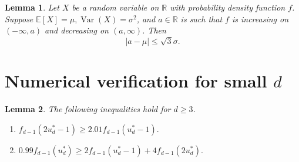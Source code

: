 \documentclass[10pt,a4paper]{amsart}
\newtheorem{lem}{Lemma}
\newcommand{\EE}{\mathbb{E}}
\newcommand{\RR}{\mathbb{R}}
\DeclareMathOperator{\Var}{Var}
\begin{document}
\begin{lem} \label{lem:unimodal}
    Let $X$ be a random variable on $\RR$ with probability density function $f$. Suppose $\EE[X]=\mu, \Var(X)=\sigma^2$, and $a\in \RR$ is such that $f$ is increasing on $(-\infty,a)$ and decreasing on $(a,\infty)$. Then 
    \[|a-\mu|\leq \sqrt{3}\sigma.\]
\end{lem}

\section{Numerical verification for small \texorpdfstring{$d$}{d}} \label{sec:numerical}

\begin{lem} \label{lem:real-layer-estimate}
    The following inequalities hold for $d\geq 3$.
    \begin{enumerate}
        \item $f_{d-1}(2u_d^*-1)\geq 2.01f_{d-1}(u_d^*-1).$
        \item $0.99f_{d-1}(u_d^*)\geq 2f_{d-1}(u_d^*-1)+4f_{d-1}(2u_d^*).$
    \end{enumerate}
\end{lem}
\end{document}
